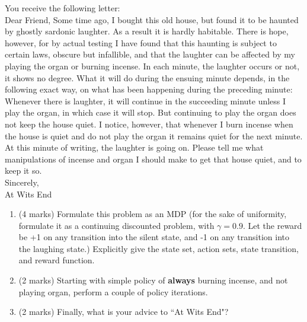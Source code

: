 \documentclass[addpoints,12pt,solution]{exam}
\begin{document}
\begin{questions}
 You receive the following letter:\\
Dear Friend, Some time ago, I bought this old house, but found it to be haunted by
ghostly sardonic laughter. As a result it is hardly habitable. There is hope, however,
for by actual testing I have found that this haunting is subject to certain laws, obscure
but infallible, and that the laughter can be affected by my playing the organ or burning
incense. In each minute, the laughter occurs or not, it shows no degree. What it will
do during the ensuing minute depends, in the following exact way, on what has been
happening during the preceding minute: Whenever there is laughter, it will continue in
the succeeding minute unless I play the organ, in which case it will stop. But continuing
to play the organ does not keep the house quiet. I notice, however, that whenever I
burn incense when the house is quiet and do not play the organ it remains quiet for the
next minute. At this minute of writing, the laughter is going on. Please tell me what
manipulations of incense and organ I should make to get that house quiet, and to keep
it so.\\
Sincerely,\\
At Wits End

\begin{enumerate}[label=(\alph*)]

\item (4 marks) Formulate this problem as an MDP (for the sake of uniformity, formulate it as a
continuing discounted problem, with $\gamma= 0.9$. Let the reward be +1 on any transition
into the silent state, and -1 on any transition into the laughing state.) Explicitly give the
state set, action sets, state transition, and reward function.

\begin{solution}

\end{solution}

\item (2 marks) Starting with simple policy of \textbf{always} burning incense, and not playing organ, perform a couple of policy iterations.

\begin{solution}

\end{solution}
    
\item (2 marks) Finally, what is your advice to ``At Wits End"?

\begin{solution}


\end{solution}
\end{enumerate}
\end{questions}
\end{document}
